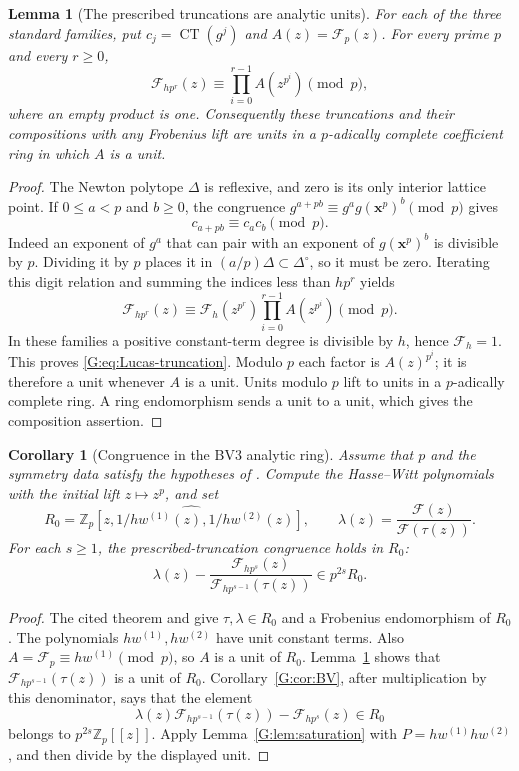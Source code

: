 \documentclass[11pt,a4paper]{article}
\newtheorem{lemma}[theorem]{Lemma}
\newtheorem{corollary}[theorem]{Corollary}
\theoremstyle{definition}\newtheorem{definition}[theorem]{Definition}
\theoremstyle{remark}\newtheorem{remark}[theorem]{Remark}
\DeclareMathOperator{\CT}{CT}
\numberwithin{equation}{section}
\begin{document}
\begin{lemma}[The prescribed truncations are analytic units]
\label{G:lem:truncation-units}
For each of the three standard families, put
$c_j=\CT(g^j)$ and $A(z)=\mathcal F_p(z)$.
For every prime $p$ and every $r\ge0$,
\begin{equation}\label{G:eq:Lucas-truncation}
 \mathcal F_{hp^r}(z)
 \equiv\prod_{i=0}^{r-1} A(z^{p^i})\pmod p,
\end{equation}
where an empty product is one. Consequently these truncations and
their compositions with any Frobenius lift are units in a
$p$-adically complete coefficient ring in which $A$ is a unit.
\end{lemma}

\begin{proof}
The Newton polytope $\Delta$ is reflexive, and zero is its only
interior lattice point. If $0\le a<p$ and $b\ge0$, the congruence
$g^{a+pb}\equiv g^a g(\mathbf x^p)^b\pmod p$ gives
\[
 c_{a+pb}\equiv c_a c_b\pmod p.
\]
Indeed an exponent of $g^a$ that can pair with an exponent of
$g(\mathbf x^p)^b$ is divisible by $p$. Dividing it by $p$ places
it in $(a/p)\Delta\subset\Delta^\circ$, so it must be zero.
Iterating this digit relation and summing the indices less than
$hp^r$ yields
\[
 \mathcal F_{hp^r}(z)
 \equiv \mathcal F_h(z^{p^r})
          \prod_{i=0}^{r-1} A(z^{p^i})\pmod p.
\]
In these families a positive constant-term degree is divisible by
$h$, hence $\mathcal F_h=1$. This proves
\eqref{G:eq:Lucas-truncation}. Modulo $p$ each factor is
$A(z)^{p^i}$; it is therefore a unit whenever $A$ is a unit.
Units modulo $p$ lift to units in a $p$-adically complete ring.
A ring endomorphism sends a unit to a unit, which gives the
composition assertion.
\end{proof}

\begin{corollary}[Congruence in the BV3 analytic ring]
\label{G:cor:analytic}
Assume that $p$ and the symmetry data satisfy the hypotheses of
\cite[Theorem~7.3]{BV3}. Compute the Hasse--Witt polynomials with
the initial lift $z\mapsto z^p$, and set
\[
 R_0=\widehat{\mathbb Z_p
       [z,1/hw^{(1)}(z),1/hw^{(2)}(z)]},\qquad
 \lambda(z)=\frac{\mathcal F(z)}{\mathcal F(\tau(z))}.
\]
For each $s\ge1$, the prescribed-truncation congruence holds in
$R_0$:
\[
 \lambda(z)
 -\frac{\mathcal F_{hp^s}(z)}
        {\mathcal F_{hp^{s-1}}(\tau(z))}
       \in p^{2s}R_0.
\]
\end{corollary}

\begin{proof}
The cited theorem and \cite[Proposition~7.7 and Theorem~7.15]{BV3}
give $\tau,\lambda\in R_0$ and a Frobenius endomorphism of $R_0$.
The polynomials $hw^{(1)},hw^{(2)}$ have unit constant terms.
Also $A=\mathcal F_p\equiv hw^{(1)}\pmod p$, so $A$ is a unit
of $R_0$. Lemma~\ref{G:lem:truncation-units} shows that
$\mathcal F_{hp^{s-1}}(\tau(z))$ is a unit of $R_0$.
Corollary~\ref{G:cor:BV}, after multiplication by this denominator,
says that the element
\[
 \lambda(z)\mathcal F_{hp^{s-1}}(\tau(z))
            -\mathcal F_{hp^s}(z)\in R_0
\]
belongs to $p^{2s}\mathbb Z_p[[z]]$. Apply
Lemma~\ref{G:lem:saturation} with
$P=hw^{(1)}hw^{(2)}$, and then divide by the displayed unit.
\end{proof}
\end{document}
